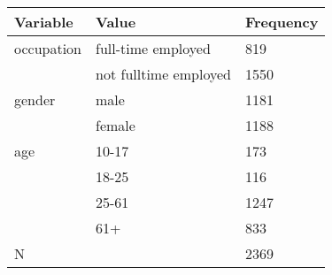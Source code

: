 \begin{tabular} 
 {l  l l}
 Variable & Value & Frequency \\ \hline \hline
 occupation & full-time employed & 819  \\
 & not fulltime employed & 1550 \\ \hline 
  gender & male & 1181  \\
 & female & 1188 \\ \hline 
  age & 10-17 & 173  \\
 &18-25 & 116 \\
 &25-61 & 1247 \\
 & 61+ & 833 \\ \hline 
 N & & 2369 \\ \hline \hline
 \end{tabular} 

